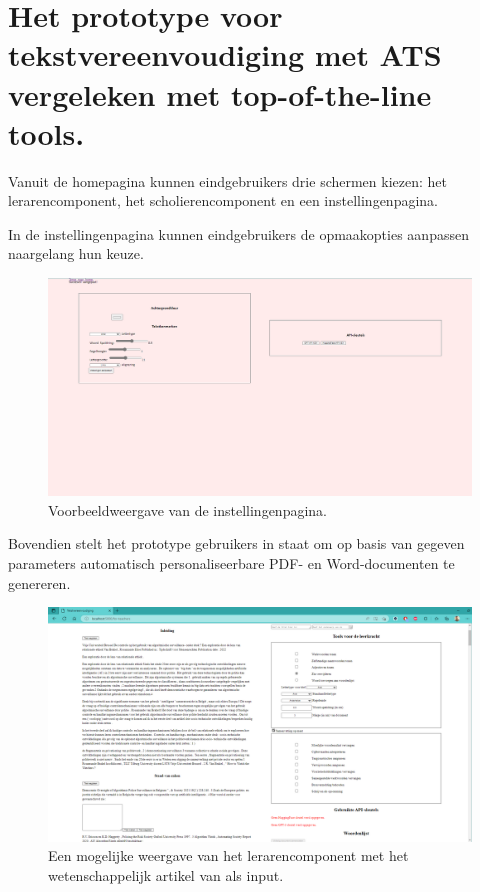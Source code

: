\section{Het prototype voor tekstvereenvoudiging met ATS vergeleken met top-of-the-line tools.}


Vanuit de homepagina kunnen eindgebruikers drie schermen kiezen: het lerarencomponent, het scholierencomponent en een instellingenpagina.

In de instellingenpagina kunnen eindgebruikers de opmaakopties aanpassen naargelang hun keuze. 

\begin{center}
	\begin{figure}[H]
		\includegraphics[width=\linewidth]{img/website-instellingen.png}
		\caption{Voorbeeldweergave van de instellingenpagina.}
		\label{img:website-instellingen}
	\end{figure}
\end{center}

Bovendien stelt het prototype gebruikers in staat om op basis van gegeven parameters automatisch personaliseerbare PDF- en Word-documenten te genereren.

\begin{figure}
	\includegraphics[width=\linewidth]{img/proto-lerarencomponent.png}
	\caption{Een mogelijke weergave van het lerarencomponent met het wetenschappelijk artikel van \textcite{VanBrakel2022} als input.}
	\label{img:proto-lerarencomponent}
\end{figure}

